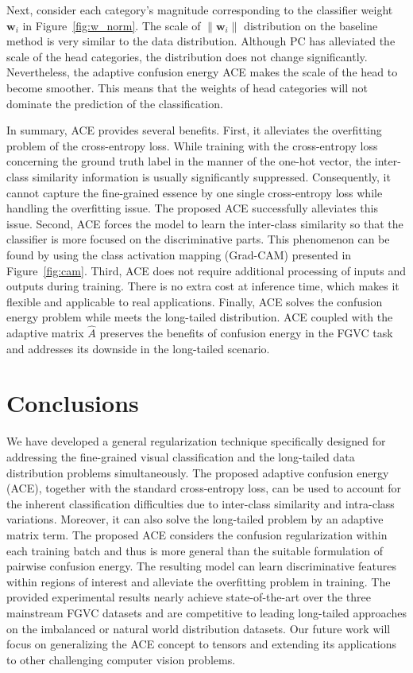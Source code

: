 \documentclass{article}
\begin{document}
Next, consider each category's magnitude corresponding to the classifier weight $\mathbf{w}_i$ in Figure~\ref{fig:w_norm}. The scale of $\| \mathbf{w}_i \|$  distribution on the baseline method is very similar to the data distribution. Although PC has alleviated the scale of the head categories, the distribution does not change significantly.  Nevertheless, the adaptive confusion energy ACE makes the scale of the head to become smoother. This means that the weights of head categories will not dominate the prediction of the classification. 

In summary, ACE provides several benefits. First, it alleviates the overfitting problem of the cross-entropy loss. While training with the cross-entropy loss concerning the ground truth label in the manner of the one-hot vector, the inter-class similarity information is usually significantly suppressed. Consequently, it cannot capture the fine-grained essence by one single cross-entropy loss while handling the overfitting issue. The proposed ACE successfully alleviates this issue. Second, ACE forces the model to learn the inter-class similarity so that the classifier is more focused on the discriminative parts. This phenomenon can be found by using the class activation mapping (Grad-CAM) \cite{selvaraju2017grad} presented in Figure~\ref{fig:cam}. Third, ACE does not require additional processing of inputs and outputs during training. There is no extra cost at inference time, which makes it flexible and applicable to real applications. Finally, ACE solves the confusion energy problem while meets the long-tailed distribution. ACE coupled with the adaptive matrix $\hat{A}$ preserves the benefits of confusion energy in the FGVC task and addresses its downside in the long-tailed scenario.

\section{Conclusions}


We have developed a general regularization technique specifically designed for addressing the fine-grained visual classification and the long-tailed data distribution problems simultaneously. The proposed adaptive confusion energy (ACE), together with the standard cross-entropy loss, can be used to account for the inherent classification difficulties due to inter-class similarity and intra-class variations. Moreover, it can also solve the long-tailed problem by an adaptive matrix term. The proposed ACE considers the confusion regularization within each training batch and thus is more general than the suitable formulation of pairwise confusion energy. The resulting model can learn discriminative features within regions of interest and alleviate the overfitting problem in training. The provided experimental results nearly achieve state-of-the-art over the three mainstream FGVC datasets and are competitive to leading long-tailed approaches on the imbalanced or natural world distribution datasets. Our future work will focus on generalizing the ACE concept to tensors and extending its applications to other challenging computer vision problems.




\end{document}
